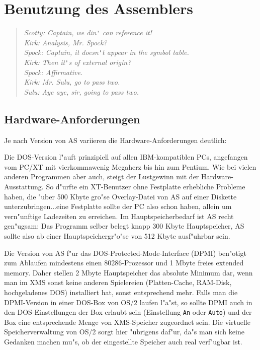 \documentclass[12pt,a4paper,twoside]{report}
\newcommand{\tty}[1]{{\tt #1}}
\begin{document}
\cleardoublepage
\chapter{Benutzung des Assemblers}

\begin{quote}\begin{raggedright}{\it
Scotty: Captain, we din\verb!'! can reference it! \\
Kirk:   Analysis, Mr. Spock? \\
Spock:  Captain, it doesn\verb!'!t appear in the symbol table. \\
Kirk:   Then it\verb!'!s of external origin? \\
Spock:  Affirmative. \\
Kirk:   Mr. Sulu, go to pass two. \\
Sulu:   Aye aye, sir, going to pass two. \\
}\end{raggedright}\end{quote}


\section{Hardware-Anforderungen}

Je nach Version von AS variieren die Hardware-Anforderungen deutlich:

Die DOS-Version  l"auft prinzipiell auf allen
IBM-kompatiblen PCs, angefangen vom PC/XT mit vierkommawenig Megaherz bis
hin zum Pentium.  Wie bei vielen anderen Programmen aber auch, steigt der
Lustgewinn mit der Hardware-Ausstattung.  So d"urfte ein XT-Benutzer ohne
Festplatte erhebliche Probleme haben, die "uber 500 Kbyte gro"se
Overlay-Datei von AS auf einer Diskette unterzubringen...eine Festplatte
sollte der PC also schon haben, allein um vern"unftige Ladezeiten zu
erreichen.  Im Hauptspeicherbedarf ist AS recht gen"ugsam: Das Programm
selber belegt knapp 300 Kbyte Hauptspeicher, AS sollte also ab einer
Hauptspeichergr"o"se von 512 Kbyte ausf"uhrbar sein.

Die Version von AS f"ur das 
DOS-Protected-Mode-Interface (DPMI) ben"otigt zum Ablaufen mindestens
einen 80286-Prozessor und 1 Mbyte freies extended memory.  Daher stellen 2
Mbyte Hauptspeicher das absolute Minimum dar, wenn man im XMS sonst keine
anderen Spielereien (Platten-Cache, RAM-Disk, hochgeladenes DOS)
installiert hat, sonst entsprechend mehr.  Falls man die DPMI-Version in
einer DOS-Box von OS/2 laufen l"a"st, so sollte DPMI auch in den
DOS-Einstellungen der Box erlaubt sein (Einstellung \tty{An} oder
\tty{Auto}) und der Box eine entsprechende Menge von XMS-Speicher
zugeordnet sein.  Die virtuelle Speicherverwaltung von OS/2 sorgt hier
"ubrigens daf"ur, da"s man sich keine Gedanken machen mu"s, ob der
eingestellte Speicher auch real verf"ugbar ist.
\end{document}
